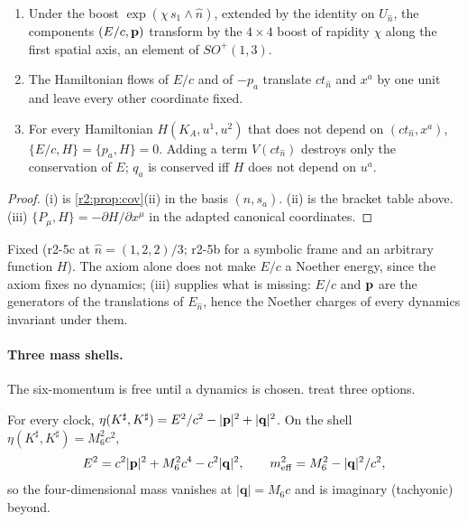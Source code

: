 \begin{proposition}
\label{r2:prop:cons}
\begin{enumerate}[label=(\roman*),leftmargin=2.2em]
\item Under the boost $\exp(\chi\,s_1\wedge \hat n)$, extended by the identity on $U_{\hat n}$, the components $(E/c,\mathbf p)$ transform by the $4\times4$ boost of
rapidity $\chi$ along the first spatial axis, an element of $SO^+(1,3)$.
\item The Hamiltonian flows of $E/c$ and of $-p_a$ translate $ct_{\hat n}$ and $x^a$ by one unit and leave every other coordinate fixed.
\item For every Hamiltonian $H(K_A,u^1,u^2)$ that does not depend on $(ct_{\hat n},x^a)$, $\{E/c,H\}=\{p_a,H\}=0$. Adding a term $V(ct_{\hat n})$ destroys only the
conservation of $E$; $q_a$ is conserved iff $H$ does not depend on $u^a$.
\end{enumerate}
\end{proposition}

\begin{proof}
(i) is \cref{r2:prop:cov}(ii) in the basis $(\hat n,s_a)$. (ii) is the bracket table above. (iii) $\{P_\mu,H\}=-\partial H/\partial x^\mu$ in the adapted
canonical coordinates.
\end{proof}

Fixed (r2-5c at $\hat n=(1,2,2)/3$; r2-5b for a symbolic frame and an arbitrary function $H$). The axiom alone does not make $E/c$ a Noether energy, since the axiom fixes no dynamics; (iii) supplies what is
missing: $E/c$ and $\mathbf p$ are the generators of the translations of $E_{\hat n}$, hence the Noether charges of every dynamics invariant under them. 

\paragraph{Three mass shells.} The six-momentum is free until a dynamics is chosen.  treat three options.

\begin{proposition}
\label{r2:prop:shellI}
For every clock, $\eta(K^\sharp,K^\sharp)=E^2/c^2-|\mathbf p|^2+|\mathbf q|^2$. On the shell $\eta(K^\sharp,K^\sharp)=M_6^2c^2$,
\[
E^2=c^2|\mathbf p|^2+M_6^2c^4-c^2|\mathbf q|^2,\qquad m_{\rm eff}^2=M_6^2-|\mathbf q|^2/c^2 ,
\]
so the four-dimensional mass vanishes at $|\mathbf q|=M_6c$ and is imaginary (tachyonic) beyond.
\end{proposition}

